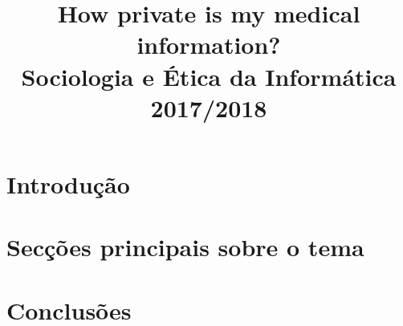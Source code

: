 \documentclass[conference]{IEEEtran}
\begin{document}
\title{How private is my medical information?\\
  \large Sociologia e Ética da Informática\\
  2017/2018				%
}

\author{
}

\maketitle

\begin{abstract}


\end{abstract}


\IEEEpeerreviewmaketitle


\section{Introdução}


\section{Secções principais sobre o tema}


\section{Conclusões}


{}

\end{document}

